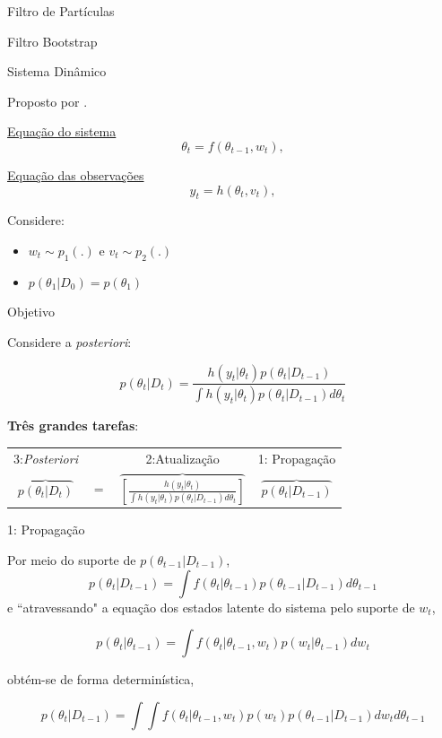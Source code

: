 \documentclass{beamer}
\begin{document}
\begin{frame}{Filtro de Partículas}
    \begin{block}{}
      \Huge  Filtro Bootstrap
    \end{block}
\end{frame}

\begin{frame}{Sistema Dinâmico}

Proposto por \cite{gordon}.

\vspace{0.5cm}

\underline{Equação do sistema}
$$\theta_t = f(\theta_{t-1},w_t),$$

\pause

\underline{Equação das observações}
$$y_t = h(\theta_{t} , v_t),$$

\pause

Considere:
\begin{itemize}
\item $w_t \sim p_1(.)$ e $v_t\sim p_2(.)$
\item $p(\theta_1|D_0)=p(\theta_1)$
\end{itemize}

\end{frame}


\begin{frame}{Objetivo}

Considere a \textit{posteriori}:

\vspace{0.5cm}

$$
p(\theta_t|D_t)  = \frac{h(y_t|\theta_t)  p(\theta_t|D_{t-1}) }{\int h(y_t|\theta_t)p(\theta_t|D_{t-1})d \theta_t}
$$

\pause

\textbf{Três grandes tarefas}:
\vspace{0.5cm}

\begin{tabular}{cccc}
3:\textit{Posteriori} & & 2:Atualização & 1: Propagação \\
$\overbrace{p(\theta_t|D_t)} $ & $=$ & $\overbrace{\left[\frac{h(y_t|\theta_t)}{\int h(y_t|\theta_t)p(\theta_t|D_{t-1})d \theta_t}\right]} $& $\overbrace{p(\theta_t|D_{t-1})}$
\end{tabular}

\end{frame}



\begin{frame}{1: Propagação}

Por meio do suporte de $p(\theta_{t-1}|D_{t-1})$,
$$
p(\theta_t|D_{t-1}) = \int f(\theta_t|\theta_{t-1})p(\theta_{t-1}|D_{t-1})d\theta_{t-1}
$$
\pause
e ``atravessando" a equação dos estados latente do sistema pelo suporte de $w_t$, 

$$
p(\theta_t|\theta_{t-1}) = \int f(\theta_t|\theta_{t-1},w_{t})p(w_{t}|\theta_{t-1})dw_{t}
$$
\pause

obtém-se de forma determinística,

$$
p(\theta_t|D_{t-1}) = \int \int f(\theta_t|\theta_{t-1},w_{t})p(w_{t})p(\theta_{t-1}|D_{t-1})dw_{t}d\theta_{t-1}
$$


\end{frame}
\end{document}
